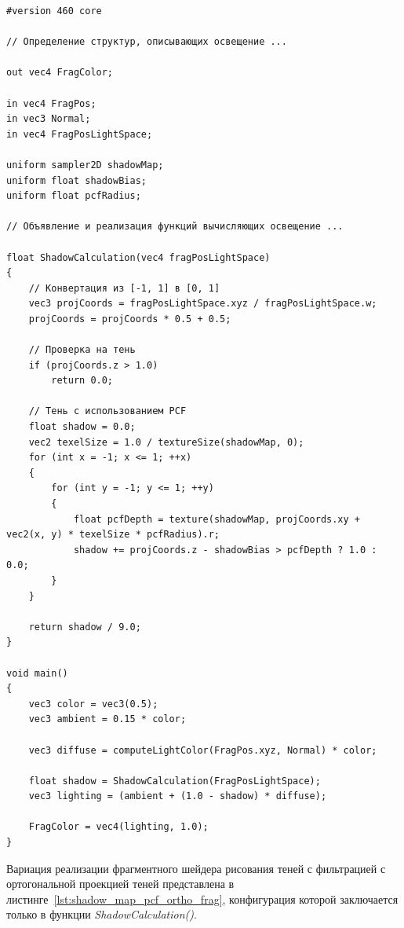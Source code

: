 \begin{center}
\captionsetup{justification=centering, singlelinecheck=off}
\begin{lstlisting}[label=lst:shadow_map_pcf_frag, caption=Фрагментный шейдер с учетом перспективного проецирония теней]
#version 460 core

// Определение структур, описывающих освещение ...

out vec4 FragColor;

in vec4 FragPos;
in vec3 Normal;
in vec4 FragPosLightSpace;

uniform sampler2D shadowMap;
uniform float shadowBias;
uniform float pcfRadius;

// Объявление и реализация функций вычисляющих освещение ...

float ShadowCalculation(vec4 fragPosLightSpace)
{
    // Конвертация из [-1, 1] в [0, 1]
    vec3 projCoords = fragPosLightSpace.xyz / fragPosLightSpace.w;
    projCoords = projCoords * 0.5 + 0.5;

    // Проверка на тень
    if (projCoords.z > 1.0)
        return 0.0;
    
    // Тень с использованием PCF
    float shadow = 0.0;
    vec2 texelSize = 1.0 / textureSize(shadowMap, 0);
    for (int x = -1; x <= 1; ++x)
    {
        for (int y = -1; y <= 1; ++y)
        {
            float pcfDepth = texture(shadowMap, projCoords.xy + vec2(x, y) * texelSize * pcfRadius).r;
            shadow += projCoords.z - shadowBias > pcfDepth ? 1.0 : 0.0;
        }
    }

    return shadow / 9.0;
}

void main()
{
    vec3 color = vec3(0.5);
    vec3 ambient = 0.15 * color;

    vec3 diffuse = computeLightColor(FragPos.xyz, Normal) * color;

    float shadow = ShadowCalculation(FragPosLightSpace);                      
    vec3 lighting = (ambient + (1.0 - shadow) * diffuse);

    FragColor = vec4(lighting, 1.0);
}
\end{lstlisting}
\end{center}

Вариация реализации фрагментного шейдера рисования теней с
фильтрацией с ортогональной проекцией теней представлена в
листинге~\ref{lst:shadow_map_pcf_ortho_frag}, конфигурация которой
заключается только в функции \textit{ShadowCalculation()}.

